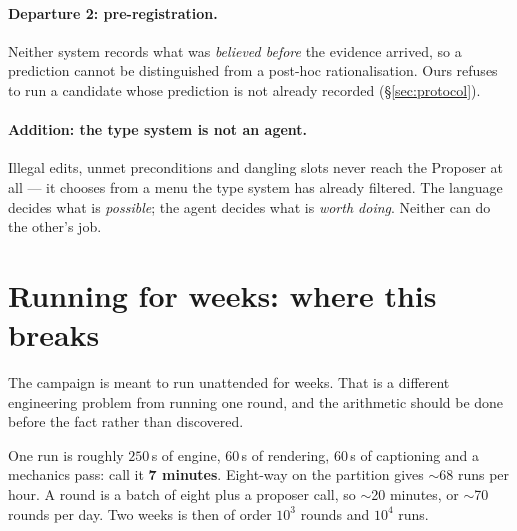 \documentclass[11pt]{article}
\begin{document}
\paragraph{Departure 2: pre-registration.}
Neither system records what was \emph{believed before} the evidence arrived, so a prediction
cannot be distinguished from a post-hoc rationalisation. Ours refuses to run a candidate whose
prediction is not already recorded (\S\ref{sec:protocol}).

\paragraph{Addition: the type system is not an agent.}
Illegal edits, unmet preconditions and dangling slots never reach the Proposer at all --- it
chooses from a menu the type system has already filtered. The language decides what is
\emph{possible}; the agent decides what is \emph{worth doing}. Neither can do the other's job.

\section{Running for weeks: where this breaks}
\label{sec:weeks}

The campaign is meant to run unattended for weeks. That is a different engineering problem from
running one round, and the arithmetic should be done before the fact rather than discovered.

One run is roughly $250\,$s of engine, $60\,$s of rendering, $60\,$s of captioning and a
mechanics pass: call it \textbf{7 minutes}. Eight-way on the partition gives $\sim$68 runs per
hour. A round is a batch of eight plus a proposer call, so $\sim$20 minutes, or $\sim$70 rounds
per day. Two weeks is then of order $10^3$ rounds and $10^4$ runs.
\end{document}
